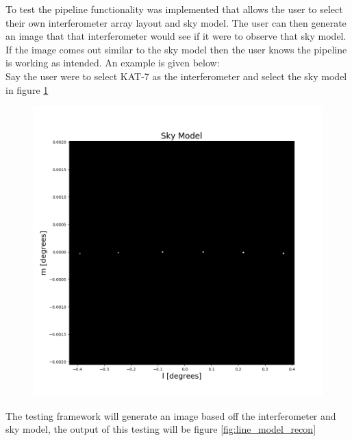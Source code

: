 To test the pipeline functionality was implemented that allows the user to select their own interferometer array layout and sky model. The user can then generate an image that that interferometer would see if it were to observe that sky model. If the image comes out similar to the sky model then the user knows the pipeline is working as intended. An example is given below: \\
Say the user were to select KAT-7 as the interferometer and select the sky model in figure \ref{fig:line_model}
\begin{figure}[H]
    \centering
    \includegraphics[scale=0.35]{images/TESTING_KAT7_LINEMODEL_SKY_MODEL.png}
    \caption{}
    \label{fig:line_model}
\end{figure}
The testing framework will generate an image based off the interferometer and sky model, the output of this testing will be figure \ref{fig:line_model_recon}

